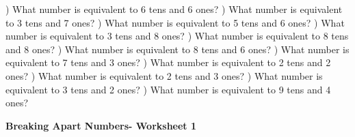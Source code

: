 \documentclass{article}%
\begin{document}
\newline%
) What number is equivalent to 6 tens and 6 ones?%
\newline%
\newline%
) What number is equivalent to 3 tens and 7 ones?%
\newline%
\newline%
) What number is equivalent to 5 tens and 6 ones?%
\newline%
\newline%
) What number is equivalent to 3 tens and 8 ones?%
\newline%
\newline%
) What number is equivalent to 8 tens and 8 ones?%
\newline%
\newline%
) What number is equivalent to 8 tens and 6 ones?%
\newline%
\newline%
) What number is equivalent to 7 tens and 3 ones?%
\newline%
\newline%
) What number is equivalent to 2 tens and 2 ones?%
\newline%
\newline%
) What number is equivalent to 2 tens and 3 ones?%
\newline%
\newline%
) What number is equivalent to 3 tens and 2 ones?%
\newline%
\newline%
) What number is equivalent to 9 tens and 4 ones?%
\newline%
\newline%
\newline%
\pagebreak%
\large%
\begin{center}%
\textbf{Breaking Apart Numbers- Worksheet 1}%
\newline%
\newline%
\newline%
\end{center} \normalsize%
\end{document}
